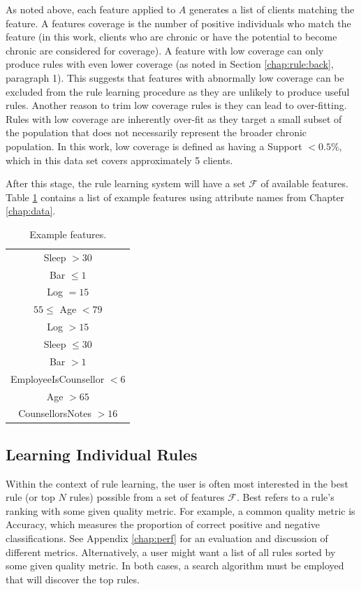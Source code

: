 As noted above, each feature applied to $A$ generates a list of clients matching the feature. A features coverage is the number of positive individuals who match the feature (in this work, clients who are chronic or have the potential to become chronic are considered for coverage). A feature with low coverage can only produce rules with even lower coverage (as noted in Section \ref{chap:rule:back}, paragraph 1). This suggests that features with abnormally low coverage can be excluded from the rule learning procedure as they are unlikely to produce useful rules.
Another reason to trim low coverage rules is they can lead to over-fitting. Rules with low coverage are inherently over-fit as they target a small subset of the population that does not necessarily represent the broader chronic population.
In this work, low coverage is defined as having a Support $< 0.5\%$, which in this data set covers approximately 5 clients.

After this stage, the rule learning system will have a set $\mathcal{F}$ of available features. Table \ref{tbl:rule:examplefeatures} contains a list of example features using attribute names from Chapter \ref{chap:data}.


\begin{table}[h]
	\centering

	\begin{tabular}{c}
	\toprule
	Sleep $> 30$ \\
	Bar $\leq 1$ \\
	Log $= 15$ \\
	$55 \leq$ Age $< 79$ \\
	Log $> 15$  \\
	Sleep $\leq 30$ \\
	Bar $> 1$ \\
	EmployeeIsCounsellor $< 6$ \\
	Age $> 65$ \\
	CounsellorsNotes $> 16$ \\

	\bottomrule
	\end{tabular}

	\caption{Example features.}
	\label{tbl:rule:examplefeatures}
\end{table}


\subsection{Learning Individual Rules} \label{chap:rule:individual}
Within the context of rule learning, the user is often most interested in the best rule (or top $N$ rules) possible from a set of features $\mathcal{F}$. Best refers to a rule's ranking with some given quality metric. For example, a common quality metric is Accuracy, which measures the proportion of correct positive and negative classifications. See Appendix \ref{chap:perf} for an evaluation and discussion of different metrics.  Alternatively, a user might want a list of all rules sorted by some given quality metric. In both cases, a search algorithm must be employed that will discover the top rules.

